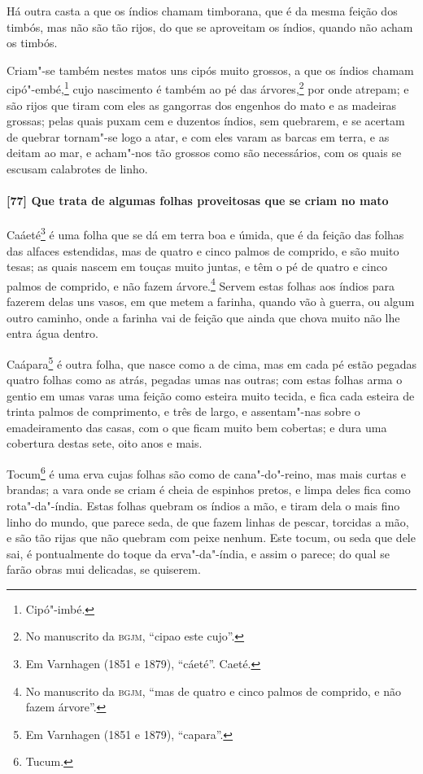 Há outra casta a que os índios chamam timborana, que é da mesma feição dos timbós, mas não
são tão rijos, do que se aproveitam os índios, quando não acham os timbós.

Criam"-se também nestes matos uns cipós muito grossos, a que os índios chamam
cipó"-embé,\footnote{ Cipó"-imbé.} cujo nascimento é também ao pé das árvores,\footnote{ No
manuscrito da \textsc{bgjm}, ``cipao este cujo''.} por onde atrepam; e são rijos que tiram
com eles as gangorras dos engenhos do mato e as madeiras grossas; pelas quais puxam cem e
duzentos índios, sem quebrarem, e se acertam de quebrar tornam"-se logo a atar, e com eles
varam as barcas em terra, e as deitam ao mar, e acham"-nos tão grossos como são
necessários, com os quais se escusam calabrotes de linho.

\paragraph{[77] Que trata de algumas folhas proveitosas que se criam no mato}\quad
Caáeté\footnote{ Em Varnhagen (1851 e 1879), ``cáeté''. Caeté.} é uma folha que se dá em
terra boa e úmida, que é da feição das folhas das alfaces estendidas, mas de quatro e
cinco palmos de comprido, e são muito tesas; as quais nascem em touças muito juntas, e têm
o pé de quatro e cinco palmos de comprido, e não fazem árvore.\footnote{ No manuscrito da
\textsc{bgjm}, ``mas de quatro e cinco palmos de comprido, e não fazem árvore''.} Servem
estas folhas aos índios para fazerem delas uns vasos, em que metem a farinha, quando vão à
guerra, ou algum outro caminho, onde a farinha vai de feição que ainda que chova muito não
lhe entra água dentro.

Caápara\footnote{ Em Varnhagen (1851 e 1879), ``capara''.} é outra folha, que nasce como a
de cima, mas em cada pé estão pegadas quatro folhas como as atrás, pegadas umas nas
outras; com estas folhas arma o gentio em umas varas uma feição como esteira muito tecida,
e fica cada esteira de trinta palmos de comprimento, e três de largo, e assentam"-nas sobre
o emadeiramento das casas, com o que ficam muito bem cobertas; e dura uma cobertura destas
sete, oito anos e mais.

Tocum\footnote{ Tucum.} é uma erva cujas folhas são como de cana"-do"-reino, mas mais curtas
e brandas; a vara onde se criam é cheia de espinhos pretos, e limpa deles fica como
rota"-da"-índia. Estas folhas quebram os índios a mão, e tiram dela o mais fino linho do
mundo, que parece seda, de que fazem linhas de pescar, torcidas a mão, e são tão rijas que
não quebram com peixe nenhum. Este tocum, ou seda que dele sai, é pontualmente do toque da
erva"-da"-índia, e assim o parece; do qual se farão obras mui delicadas, se quiserem.

